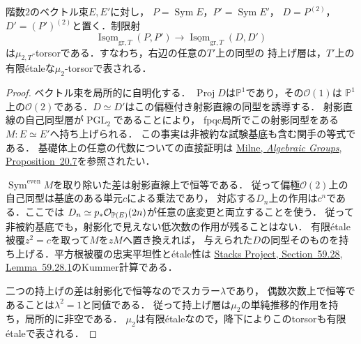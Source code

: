 \begin{lemma}[二次Veronese錐の同型の持上げ]
\label{lem:abel-relative-conic-lift}
階数$2$のベクトル束$E,E'$に対し，
$P=\operatorname{Sym}E$，$P'=\operatorname{Sym}E'$，
$D=P^{(2)}$，$D'=(P')^{(2)}$と置く．制限射
\begin{equation}\label{eq:abel-conic-isom-torsor}
 \underline{\operatorname{Isom}}_{\mathrm{gr},T}(P,P')
  \longrightarrow
 \underline{\operatorname{Isom}}_{\mathrm{gr},T}(D,D')
\end{equation}
は$\mu_{2,T}$-torsorである．すなわち，右辺の任意の$T'$上の同型の
持上げ層は，$T'$上の有限\'etaleな$\mu_2$-torsorで表される．
\end{lemma}
\begin{proof}
ベクトル束を局所的に自明化する．
$\operatorname{Proj}D$は$\mathbb P^1$であり，その$\mathcal O(1)$は
$\mathbb P^1$上の$\mathcal O(2)$である．$D\simeq D'$はこの偏極付き射影直線の同型を誘導する．
射影直線の自己同型層が$\operatorname{PGL}_2$であることにより，
fpqc局所でこの射影同型をある$M:E\simeq E'$へ持ち上げられる．
この事実は非被約な試験基底も含む関手の等式である．
基礎体上の任意の代数についての直接証明は
\href{https://www.jmilne.org/math/Books/iAG2022.pdf}
{Milne, \emph{Algebraic Groups}, Proposition~20.7}を参照されたい．

$\operatorname{Sym}^{\mathrm{even}}M$を取り除いた差は射影直線上で恒等である．
従って偏極$\mathcal O(2)$上の自己同型は基底のある単元$c$による乗法であり，
対応する$D_n$上の作用は$c^n$である．ここでは
$D_n\simeq p_*\mathcal O_{\mathbb P(E)}(2n)$が任意の底変更と両立することを使う．
従って非被約基底でも，射影化で見えない低次数の作用が残ることはない．
有限\'etale被覆$z^2=c$を取って$M$を$zM$へ置き換えれば，
与えられた$D$の同型そのものを持ち上げる．平方根被覆の忠実平坦性と\'etale性は
\href{https://stacks.math.columbia.edu/tag/03PK}
{Stacks Project, Section~59.28, Lemma~59.28.1}のKummer計算である．

二つの持上げの差は射影化で恒等なのでスカラー$\lambda$であり，
偶数次数上で恒等であることは$\lambda^2=1$と同値である．
従って持上げ層は$\mu_2$の単純推移的作用を持ち，局所的に非空である．
$\mu_2$は有限\'etaleなので，降下によりこのtorsorも有限\'etaleで表される．
\end{proof}

